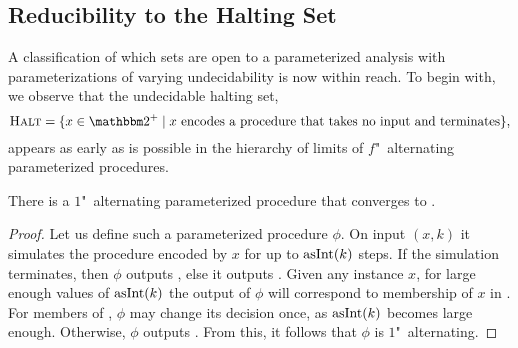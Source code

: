 \subsection{Reducibility to the Halting Set}
\label{sec:computability:halt}%
A classification of which sets are open to a parameterized analysis with parameterizations of varying undecidability is now within reach.
To begin with, we observe that the undecidable halting set,
\begin{equation*}
  \pr{Halt} \deq \{x \in \binary^+ \st \text{$x$ encodes a procedure that takes no input and terminates}\},
\end{equation*}
appears as early as is possible in the hierarchy of limits of $f$"~alternating parameterized procedures.
\begin{lemma}
\label{lem:one_halting}%
  There is a $1$"~alternating parameterized procedure that converges to .
\end{lemma}
\begin{proof}
  Let us define such a parameterized procedure $\phi$.
  On input $(x, k)$ it simulates the procedure encoded by $x$ for up to $\operatorname{asInt}(k)$ steps.
  If the simulation terminates, then $\phi$ outputs , else it outputs .
  Given any instance $x$, for large enough values of $\operatorname{asInt}(k)$ the output of $\phi$ will correspond to membership of $x$ in .
  For members of , $\phi$ may change its decision once, as $\operatorname{asInt}(k)$ becomes large enough.
  Otherwise, $\phi$ outputs .
  From this, it follows that $\phi$ is $1$"~alternating.
\end{proof}

